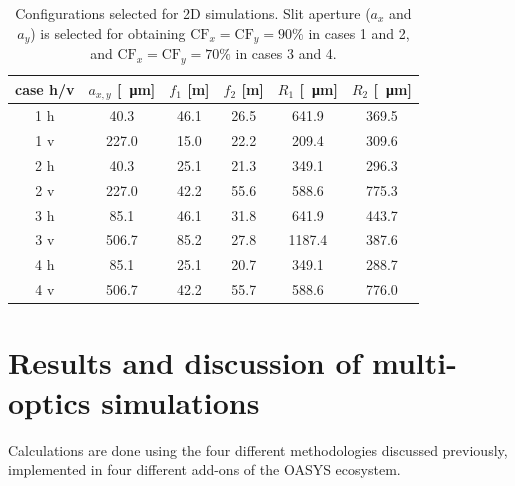 \documentclass[preprint]{iucr}
\begin{document}
\begin{table}[]
    \label{table:2Dusercases}
    \caption{Configurations selected for 2D simulations. Slit aperture ($a_x$ and $a_y$) is selected for obtaining $\text{CF}_{x}=\text{CF}_{y}=90\%$ in cases 1 and 2, and $\text{CF}_{x}=\text{CF}_{y}=70\%$ in cases 3 and 4. 
    }
    \begin{tabular}{c|c|c|c|c|c}
         case h/v & $a_{x,y}$ [\SI{}{\micro\meter}] & $f_1$ [m] & $f_2$ [m] & $R_1$ [\SI{}{\micro\meter}]& $R_2$ [\SI{}{\micro\meter}] \\
         \hline
1 h &      40.3 & 46.1 &     26.5 &     641.9 &     369.5 
\\
1 v &      227.0 & 15.0 &     22.2 &     209.4 &     309.6 
\\
\hline
2 h &      40.3 & 25.1 &     21.3 &     349.1 &     296.3  
\\
2 v &      227.0 & 42.2 &     55.6 &     588.6 &     775.3 
\\
\hline \hline
3 h &      85.1 & 46.1 &     31.8 &     641.9 &     443.7 
\\
3 v &      506.7 & 85.2 &     27.8 &     1187.4 &     387.6  
\\
\hline
4 h &      85.1 & 25.1 &     20.7 &     349.1 &     288.7 
\\
4 v &      506.7 & 42.2 &     55.7 &     588.6 &     776.0 

    \end{tabular}
\end{table}


\section{Results and discussion of multi-optics simulations}
\label{sec:complete-beamline}

Calculations are done using the four different methodologies discussed previously, implemented in four different add-ons of the OASYS ecosystem. 
\end{document}
